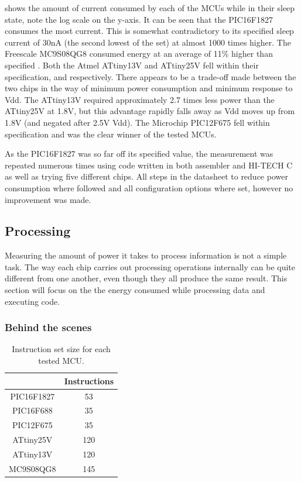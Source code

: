  shows the amount of current consumed
by each of the MCUs while in their sleep state, note the log scale
on the y-axis. It can be seen that the PIC16F1827 consumes the most
current. This is somewhat contradictory to its specified sleep current
of 30nA \cite{PIC16F1827} (the second lowest of the set) at almost
1000 times higher. The Freescale MC9S08QG8 consumed energy at an average
of 11\% higher than specified \cite{MC9S08QG8}. Both the Atmel ATtiny13V
and ATtiny25V fell within their specification, \cite{AtmelATtiny13}
and \cite{AtmelATtiny25} respectively. There appears to be a trade-off
made between the two chips in the way of minimum power consumption
and minimum response to Vdd. The ATtiny13V required approximately
2.7 times less power than the ATtiny25V at 1.8V, but this advantage
rapidly falls away as Vdd moves up from 1.8V (and negated after 2.5V
Vdd). The Microchip PIC12F675 fell within specification\cite{PIC12F675}
and was the clear winner of the tested MCUs.

As the PIC16F1827 was so far off its specified value, the measurement
was repeated numerous times using code written in both assembler and
HI-TECH C as well as trying five different chips. All steps in the
datasheet to reduce power consumption where followed and all configuration
options where set, however no improvement was made.


\subsection{Processing}

Measuring the amount of power it takes to process information is not
a simple task. The way each chip carries out processing operations
internally can be quite different from one another, even though they
all produce the same result. This section will focus on the the energy
consumed while processing data and executing code.


\subsubsection{Behind the scenes \label{sub:Behind-the-scenes}}

\begin{table}
\begin{centering}
\begin{tabular}{|c|c|}
\cline{2-2}
\multicolumn{1}{c|}{} & Instructions\tabularnewline
\hline
PIC16F1827 & 53\tabularnewline
\hline
PIC16F688 & 35\tabularnewline
\hline
PIC12F675 & 35\tabularnewline
\hline
ATtiny25V & 120\tabularnewline
\hline
ATtiny13V & 120\tabularnewline
\hline
MC9S08QG8 & 145\tabularnewline
\hline
\end{tabular}
\par\end{centering}

\centering{}\protect\caption{\label{tab:Number-of-instructions}Instruction set size for each tested
MCU.}
\end{table}


